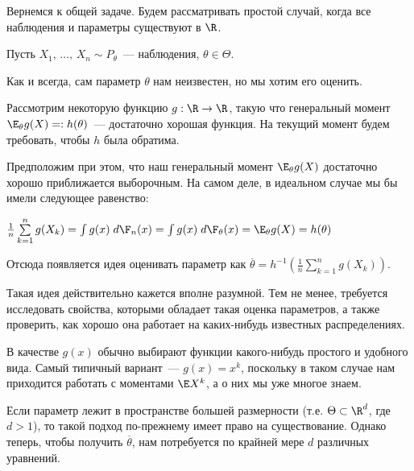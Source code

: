 \begin{problem}
	\slashns
	
	Вернемся к общей задаче. Будем рассматривать простой случай, когда все наблюдения и параметры существуют в $\R$.
	
	Пусть $X_1, \, \ldots, \, X_n \sim P_{\theta}$~--- наблюдения, $\theta \in \Theta$.
	
	Как и всегда, сам параметр $\theta$ нам неизвестен, но мы хотим его оценить.
\end{problem}

\begin{solution}
	\slashns
	
	Рассмотрим некоторую функцию $g : \R \to \R$, такую что генеральный момент $\E_{\theta} g(X) =: h(\theta)$~--- достаточно хорошая функция. На текущий момент будем требовать, чтобы $h$ была обратима.
	
	\vspace*{-1pt}
	Предположим при этом, что наш генеральный момент $\E_{\theta} g(X)$ достаточно хорошо приближается выборочным. На самом деле, в идеальном случае мы бы имели следующее равенство:
	
	\vspace*{-1pt}
	$\frac1n \sum\limits_{k=1}^{n} g(X_k) = \int g(x) \; d \F_n(x) = \int g(x) \; d \F_{\theta}(x) = \E_{\theta} g(X) = h(\theta)$
	
	Отсюда появляется идея оценивать параметр как $\overline{\theta} = h^{-1} \left(\frac1n \sum\limits_{k=1}^{n} g(X_k) \right)$.
	
	Такая идея действительно кажется вполне разумной. Тем не менее, требуется исследовать свойства, которыми обладает такая оценка параметров, а также проверить, как хорошо она работает на каких-нибудь известных распределениях. 
\end{solution}

\begin{remark}
	\slashns
	
	В качестве $g(x)$ обычно выбирают функции какого-нибудь простого и удобного вида. Самый типичный вариант~--- $g(x) = x^k$, поскольку в таком случае нам приходится работать с моментами $\E X^k$, а о них мы уже многое знаем.
\end{remark}

\begin{remark}
	\slashns
	
	Если параметр лежит в пространстве большей размерности (т.е. $\Theta \subset \R^d$, где $d > 1$), то такой подход по-прежнему имеет право на существование. Однако теперь, чтобы получить $\overline{\theta}$, нам потребуется по крайней мере $d$ различных уравнений.
\end{remark}

